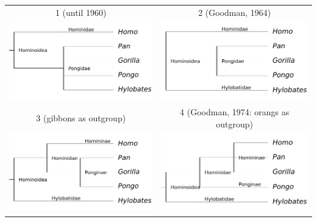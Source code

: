 \begin{tabular}{cc}
1 (until 1960) & 2 (Goodman, 1964) \\
\includegraphics[scale=0.7]{homino_0.pdf} & \includegraphics[scale=0.7]{homino_1.pdf} \\
3 (gibbons as outgroup) & 4 (Goodman, 1974: orangs as outgroup) \\
\includegraphics[scale=0.7]{homino_2.pdf} & \includegraphics[scale=0.7]{homino_3.pdf} \\

\end{tabular}
